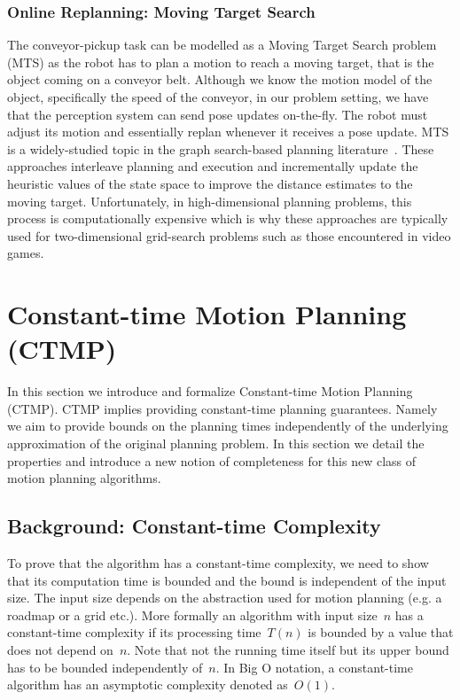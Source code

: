 \documentclass[a4paper]{report}
\begin{document}
\subsection{Online Replanning: Moving Target Search}
The conveyor-pickup task can be modelled as a Moving Target Search problem (MTS) as the robot has to plan a motion to reach a moving target, that is the object coming on a conveyor belt. Although we know the motion model of the object, specifically the speed of the conveyor, in our problem setting, we have that the perception system can send pose updates on-the-fly. The robot must adjust its motion and essentially replan whenever it receives a pose update. MTS is a widely-studied topic in the graph search-based planning literature~\cite{ishida1991moving,ishida1995moving,koenig2007speeding,sun2010moving}. 
These approaches interleave planning and execution and incrementally update the heuristic values of the state space to improve the distance estimates to the moving target. Unfortunately, in high-dimensional planning problems, this process is computationally expensive which is why these approaches are typically used for two-dimensional grid-search problems such as those encountered in video games.


\newpage
\chapter{Constant-time Motion Planning (CTMP)}
\label{sec:ctmp}
In this section we introduce and formalize Constant-time Motion Planning (CTMP). CTMP implies providing constant-time planning guarantees. Namely we aim to provide bounds on the planning times independently of the underlying approximation of the original planning problem. In this section we detail the properties and introduce a new notion of completeness for this new class of motion planning algorithms. 

\section{Background: Constant-time Complexity}
To prove that the algorithm has a constant-time complexity, we need to show that its computation time is bounded and the bound is independent of the input size. The input size depends on the abstraction used for motion planning (e.g. a roadmap or a grid etc.). More formally an algorithm with input size~$n$ has a constant-time complexity if its processing time~$T(n)$ is bounded by a value that does not depend on~$n$.
Note that not the running time itself but its upper bound has to be bounded independently of~$n$. In Big O notation, a constant-time algorithm has an asymptotic complexity denoted as~$O(1)$.
\end{document}
